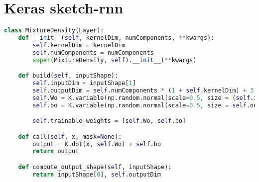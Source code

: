 \section{Keras sketch-rnn} %
\label{sub:keras_sketch_rnn}

\begin{lstlisting}[language = Python, frame = single, caption = {Il layer personalizzato che implementa l'output per la mistura gaussiana}, captionpos = b]
class MixtureDensity(Layer):
    def __init__(self, kernelDim, numComponents, **kwargs):
        self.kernelDim = kernelDim
        self.numComponents = numComponents
        super(MixtureDensity, self).__init__(**kwargs)

    def build(self, inputShape):
        self.inputDim = inputShape[1]
        self.outputDim = self.numComponents * (1 + self.kernelDim) + 3
        self.Wo = K.variable(np.random.normal(scale=0.5, size = (self.inputDim, self.outputDim)))  # TODO check if random.normal is a meaningful choice
        self.bo = K.variable(np.random.normal(scale=0.5, size = self.outputDim))

        self.trainable_weights = [self.Wo, self.bo]

    def call(self, x, mask=None):
        output = K.dot(x, self.Wo) + self.bo
        return output

    def compute_output_shape(self, inputShape):
        return inputShape[0], self.outputDim
\end{lstlisting}
\newpage

